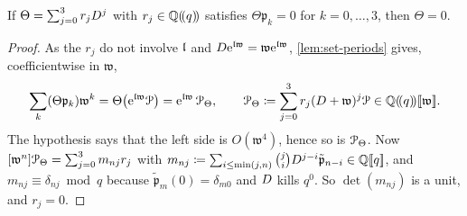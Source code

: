 \begin{lem}
\label{lem:set-order3}
If $\Theta=\sum_{j=0}^3r_jD^j$ with $r_j\in\mathbb{Q}(\!(q)\!)$ satisfies $\Theta\mathfrak p_k=0$ for $k=0,\dots,3$, then $\Theta=0$.
\end{lem}

\begin{proof}
As the $r_j$ do not involve $\mathfrak{l}$ and $D\mathrm{e}^{\mathfrak{l}\mathfrak w}=\mathfrak w\mathrm{e}^{\mathfrak{l}\mathfrak w}$, \cref{lem:set-periods} gives, coefficientwise in $\mathfrak w$,
\[
\sum_k(\Theta\mathfrak p_k)\mathfrak w^k=\Theta\bigl(\mathrm{e}^{\mathfrak{l}\mathfrak w}\mathcal{P}\bigr)=\mathrm{e}^{\mathfrak{l}\mathfrak w}\,\mathcal{P}_\Theta,\qquad\mathcal{P}_\Theta\coloneqq\sum_{j=0}^3r_j(D+\mathfrak w)^j\mathcal{P}\in\mathbb{Q}(\!(q)\!)[\![ \mathfrak w ]\!].
\]
The hypothesis says that the left side is $O(\mathfrak w^4)$, hence so is $\mathcal{P}_\Theta$. Now $[\mathfrak w^n]\mathcal{P}_\Theta=\sum_{j=0}^3m_{nj}r_j$ with $m_{nj}\coloneqq\sum_{i\leq\min(j,n)}\binom jiD^{j-i}\tilde{\mathfrak p}_{n-i}\in\mathbb{Q}[\![ q ]\!]$, and $m_{nj}\equiv\delta_{nj}\bmod q$ because $\tilde{\mathfrak p}_m(0)=\delta_{m0}$ and $D$ kills $q^0$. So $\det(m_{nj})$ is a unit, and $r_j=0$.
\end{proof}

